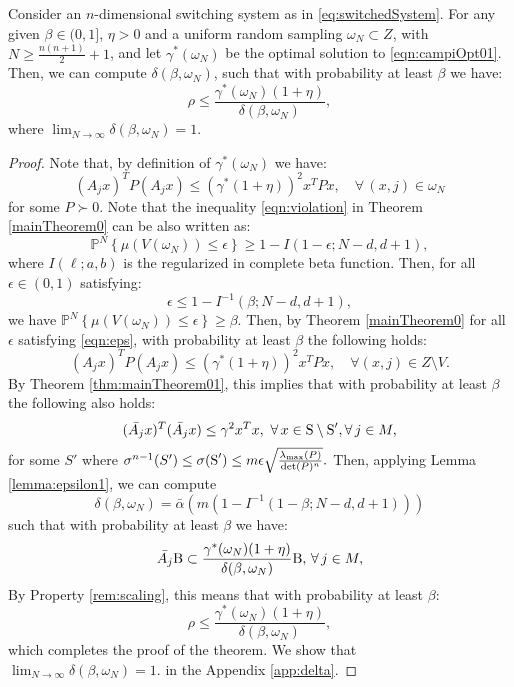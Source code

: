 
\begin{theorem}\label{thm:mainTheorem}Consider an $n$-dimensional switching system as in \eqref{eq:switchedSystem}. For any given $\beta \in (0,1]$, $\eta > 0$ and a uniform random sampling $\omega_N \subset Z$, with $N \geq \frac{n(n+1)}{2}+1$, and let $\gamma^*(\omega_N) $ be the optimal solution to \eqref{eqn:campiOpt01}. Then, we can compute $\delta(\beta, \omega_N)$, such that with probability at least $\beta$ we have:
$$\rho \leq \frac{\gamma^*(\omega_N) (1+ \eta)}{\delta(\beta, \omega_N)},$$
where $\lim_{N \to \infty}\delta(\beta, \omega_N) = 1$.
\end{theorem}

\begin{proof}
Note that, by definition of $\gamma^*(\omega_N)$ we have:
\begin{equation*} (A_j x)^TP(A_j x) \leq {(\gamma^*(1+\eta))}^2 x^TPx, \quad \forall\, (x, j)  \in \omega_N \end{equation*}
for some $P \succ 0$. 
Note that the inequality \eqref{eqn:violation} in Theorem \ref{mainTheorem0} can be also written as:
\begin{equation}\label{eqn:violation2}\mathbb{P}^N\left\{ \mu(V(\omega_N)) \leq \epsilon \right\} \geq 1- I(1-\epsilon; N-d, d+1),\end{equation}
where $I(\ell;a,b)$ is the regularized in complete beta function. Then, for all $\epsilon \in (0,1)$ satisfying:
\begin{equation}\label{eqn:eps}\epsilon \leq 1- I^{-1}(\beta; N-d, d+1),\end{equation} we have $\mathbb{P}^N\left\{ \mu(V(\omega_N)) \leq \epsilon \right\} \geq \beta$.
Then, by Theorem \ref{mainTheorem0} for all $\epsilon$ satisfying \eqref{eqn:eps}, with probability at least $\beta$ the following holds:
\begin{equation*} (A_jx)^TP(A_jx) \leq  {(\gamma^*(1+\eta))}^2 x^TPx, \quad \forall (x, j) \in Z \setminus V.\end{equation*}
By Theorem \ref{thm:mainTheorem01}, this implies that with probability at least $\beta$ the following also holds:
\begin{equation*}(\bar{A_j} x)^T(\bar{A_j} x) \leq {\gamma}^2x^Tx,\,\, \forall\, x \in \text{S} \setminus \text{S}', \forall\, j \in M,\end{equation*}
for some $S'$ where $\sigma^{n-1}(S') \leq \sigma(\text{S}') \leq m\epsilon \sqrt{\frac{\lambda_{\max}(P)}{\det(P)^n}}.$ Then, applying Lemma \ref{lemma:epsilon1}, we can compute $$\delta(\beta, \omega_N) = \bar{\alpha}(m(1- I^{-1}(1-\beta; N-d, d+1)))$$ such that with probability at least $\beta$ we have:
\begin{equation*}
\bar{A_j} \text{B} \subset \frac{\gamma^*(\omega_N)(1+\eta)}{\delta(\beta, \omega_N)}\text{B},\, \forall\, j \in M,
\end{equation*}
By Property \ref{rem:scaling}, this means that with probability at least $\beta$:
$$\rho \leq \frac{\gamma^*(\omega_N) (1 + \eta)}{\delta(\beta, \omega_N)},$$
which completes the proof of the theorem. We show that $\lim_{N \to \infty}\delta(\beta, \omega_N) = 1.$ in the Appendix \ref{app:delta}.




\end{proof}
